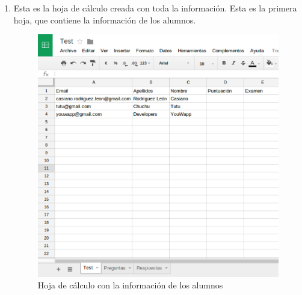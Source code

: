 \begin{enumerate}
  \item Esta es la hoja de c\'alculo creada con toda la informaci\'on. Esta es la primera hoja, que contiene la informaci\'on de los alumnos.
  \begin{figure}[!th]
  \begin{center}
  \includegraphics[width=1.1\textwidth]{images/app11.eps}
  \caption{Hoja de c\'alculo con la informaci\'on de los alumnos}
  \label{fig:app11}
  \end{center}
  \end{figure}
  \newpage
  

\end{enumerate}
